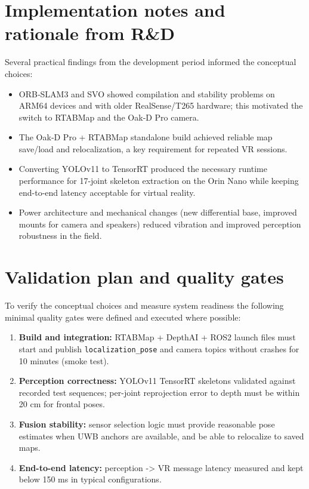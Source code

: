 \section{Implementation notes and rationale from R\&D}

Several practical findings from the development period informed the conceptual choices:

\begin{itemize}
	\item ORB‑SLAM3 and SVO showed compilation and stability problems on ARM64 devices and with older RealSense/T265 hardware; this motivated the switch to RTABMap and the Oak‑D Pro camera.
	\item The Oak‑D Pro + RTABMap standalone build achieved reliable map save/load and relocalization, a key requirement for repeated VR sessions.
	\item Converting YOLOv11 to TensorRT produced the necessary runtime performance for 17-joint skeleton extraction on the Orin Nano while keeping end-to-end latency acceptable for virtual reality.
	\item Power architecture and mechanical changes (new differential base, improved mounts for camera and speakers) reduced vibration and improved perception robustness in the field.
\end{itemize}

\section{Validation plan and quality gates}

To verify the conceptual choices and measure system readiness the following minimal quality gates were defined and executed where possible:

\begin{enumerate}
	\item \textbf{Build and integration:} RTABMap + DepthAI + ROS2 launch files must start and publish \texttt{localization\_pose} and camera topics without crashes for 10 minutes (smoke test).
	\item \textbf{Perception correctness:} YOLOv11 TensorRT skeletons validated against recorded test sequences; per-joint reprojection error to depth must be within 20 cm for frontal poses.
	\item \textbf{Fusion stability:} sensor selection logic must provide reasonable pose estimates when UWB anchors are available, and be able to relocalize to saved maps.
	\item \textbf{End-to-end latency:} perception -> VR message latency measured and kept below 150 ms in typical configurations.
\end{enumerate}

